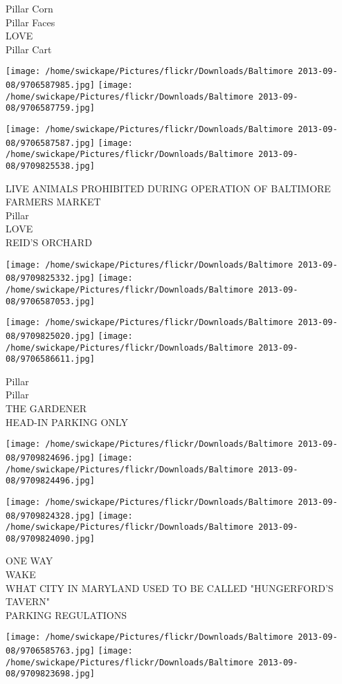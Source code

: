\documentclass[10pt,letterpaper]{article}
\begin{document}
Pillar Corn\\
Pillar Faces\\
LOVE\\
Pillar Cart
\pagebreak

\texttt{[image: /home/swickape/Pictures/flickr/Downloads/Baltimore 2013-09-08/9706587985.jpg]}
\texttt{[image: /home/swickape/Pictures/flickr/Downloads/Baltimore 2013-09-08/9706587759.jpg]}

\texttt{[image: /home/swickape/Pictures/flickr/Downloads/Baltimore 2013-09-08/9706587587.jpg]}
\texttt{[image: /home/swickape/Pictures/flickr/Downloads/Baltimore 2013-09-08/9709825538.jpg]}

LIVE ANIMALS PROHIBITED DURING OPERATION OF BALTIMORE FARMERS MARKET\\
Pillar\\
LOVE\\
REID'S ORCHARD
\pagebreak

\texttt{[image: /home/swickape/Pictures/flickr/Downloads/Baltimore 2013-09-08/9709825332.jpg]}
\texttt{[image: /home/swickape/Pictures/flickr/Downloads/Baltimore 2013-09-08/9706587053.jpg]}

\texttt{[image: /home/swickape/Pictures/flickr/Downloads/Baltimore 2013-09-08/9709825020.jpg]}
\texttt{[image: /home/swickape/Pictures/flickr/Downloads/Baltimore 2013-09-08/9706586611.jpg]}

Pillar\\
Pillar\\
THE GARDENER\\
HEAD{-}IN PARKING ONLY
\pagebreak

\texttt{[image: /home/swickape/Pictures/flickr/Downloads/Baltimore 2013-09-08/9709824696.jpg]}
\texttt{[image: /home/swickape/Pictures/flickr/Downloads/Baltimore 2013-09-08/9709824496.jpg]}

\texttt{[image: /home/swickape/Pictures/flickr/Downloads/Baltimore 2013-09-08/9709824328.jpg]}
\texttt{[image: /home/swickape/Pictures/flickr/Downloads/Baltimore 2013-09-08/9709824090.jpg]}

ONE WAY\\
WAKE\\
WHAT CITY IN MARYLAND USED TO BE CALLED "HUNGERFORD'S TAVERN"\\
PARKING REGULATIONS
\pagebreak

\texttt{[image: /home/swickape/Pictures/flickr/Downloads/Baltimore 2013-09-08/9706585763.jpg]}
\texttt{[image: /home/swickape/Pictures/flickr/Downloads/Baltimore 2013-09-08/9709823698.jpg]}
\end{document}
